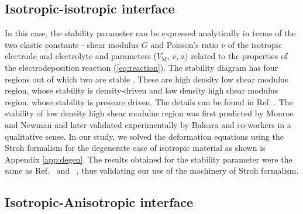 \documentclass[%
reprint,
 amsmath,amssymb,
 aps,
 prb,
]{revtex4-1}
\begin{document}
\subsection{Isotropic-isotropic interface}
In this case, the stability parameter can be expressed analytically in terms of the two elastic constants - shear modulus $G$ and Poisson's ratio $\nu$ of the isotropic electrode and electrolyte and parameters ($V_\mathrm{M}$, $v$, $\mathrm{z}$) related to the properties of the electrodeposition reaction (\ref{eq:reaction}). The stability diagram has four regions out of which two are stable \cite{ahmad2017stability}. These are high density low shear modulus region, whose stability is density-driven and low density high shear modulus region, whose stability is pressure driven. The details can be found in Ref. . The stability of low density high shear modulus region was first predicted by Monroe and Newman \cite{Monroe2005Impact} and later validated experimentally by Balsara and co-workers \cite{balsara2012-modadh, balsara2016-mod} in a qualitative sense. In our study, we solved the deformation equations using the Stroh formalism for the degenerate case of isotropic material as shown is Appendix \ref{app:degen}. The results obtained for the stability parameter were the same as Ref.~ and ~, thus validating our use of the machinery of Stroh formalism.

\subsection{Isotropic-Anisotropic interface}
\end{document}
